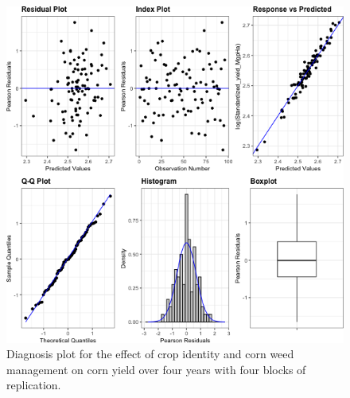 \documentclass[
]{article}
\begin{document}
\begin{figure}
\centering
\includegraphics{AppendixA-model-diagnosis_files/figure-latex/corn-mod-1.png}
\caption{\label{fig:corn-mod}Diagnosis plot for the effect of crop identity and corn weed management on corn yield over four years with four blocks of replication.}
\end{figure}
\end{document}
